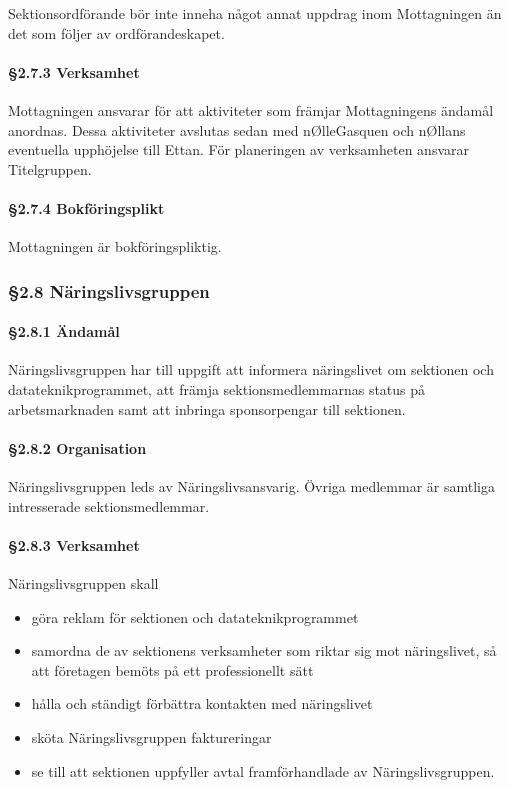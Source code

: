 Sektionsordförande bör inte inneha något annat uppdrag inom Mottagningen än det som följer av ordförandeskapet.

\paragraph{§2.7.3 Verksamhet}

Mottagningen ansvarar för att aktiviteter som främjar Mottagningens ändamål anordnas. Dessa aktiviteter avslutas sedan med nØlleGasquen och nØllans eventuella upphöjelse till Ettan. För planeringen av verksamheten ansvarar Titelgruppen.

\paragraph{§2.7.4 Bokföringsplikt}

Mottagningen är bokföringspliktig.

\subsubsection{§2.8 Näringslivsgruppen}

\paragraph{§2.8.1 Ändamål}

Näringslivsgruppen har till uppgift att informera näringslivet om sektionen och datateknikprogrammet, att främja sektionsmedlemmarnas status på arbetsmarknaden samt att inbringa sponsorpengar till sektionen.

\paragraph{§2.8.2 Organisation}

Näringslivsgruppen leds av Näringslivsansvarig. Övriga medlemmar är samtliga intresserade sektionsmedlemmar.

\paragraph{§2.8.3 Verksamhet}

Näringslivsgruppen skall

\begin{itemize}
  \item göra reklam för sektionen och datateknikprogrammet
  \item samordna de av sektionens verksamheter som riktar sig mot näringslivet, så att företagen bemöts på ett professionellt sätt
  \item hålla och ständigt förbättra kontakten med näringslivet
  \item sköta Näringslivsgruppen faktureringar
  \item se till att sektionen uppfyller avtal framförhandlade av Näringslivsgruppen.
\end{itemize}

